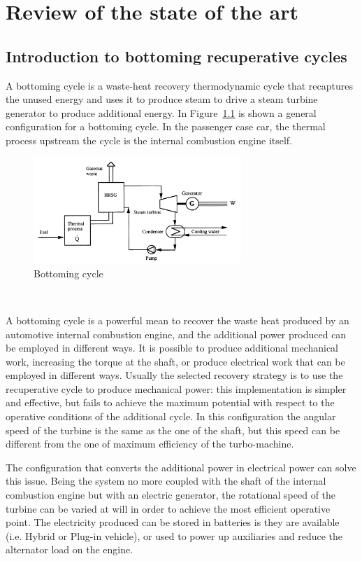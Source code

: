 \chapter{Review of the state of the art}

\section{Introduction to bottoming recuperative cycles}

A bottoming cycle is a waste-heat recovery thermodynamic cycle that recaptures the unused energy and uses it to produce steam to drive a steam turbine generator to produce additional energy. In Figure~\ref{fig:bottoming} is shown a general configuration for a bottoming cycle. In the passenger case car, the thermal process upstream the cycle is the internal combustion engine itself.

\begin{figure}[ht]
  \centering
  \includegraphics[width=0.7\textwidth]{figures/review/bottoming.jpg}
  \caption{Bottoming cycle \label{fig:bottoming} }
\end{figure}
~

A bottoming cycle is a powerful mean to recover the waste heat produced by an automotive internal combustion engine, and the additional power produced can be employed in different ways. It is possible to produce additional mechanical work, increasing the torque at the shaft, or produce electrical work that can be employed in different ways. Usually the selected recovery strategy is to use the recuperative cycle to produce mechanical power: this implementation is simpler and effective, but fails to achieve the maximum potential with respect to the operative conditions of the additional cycle. In this configuration the angular speed of the turbine is the same as the one of the shaft, but this speed can be different from the one of maximum efficiency of the turbo-machine.

The configuration that converts the additional power in electrical power can solve this issue. Being the system no more coupled with the shaft of the internal combustion engine but with an electric generator, the rotational speed of the turbine can be varied at will in order to achieve the most efficient operative point. The electricity produced can be stored in batteries is they are available (i.e. Hybrid or Plug-in vehicle), or used to power up auxiliaries and reduce the alternator load on the engine.

